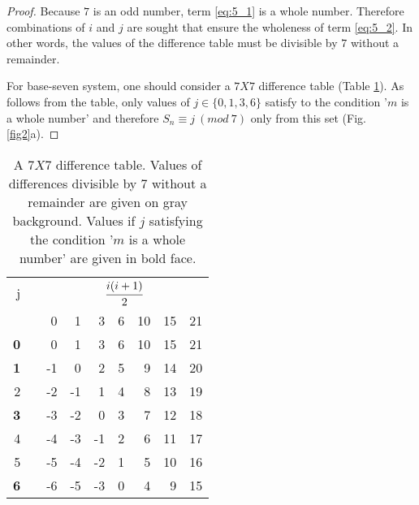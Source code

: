 \documentclass[12pt, twoside, leqno]{article}
\theoremstyle{definition}
\numberwithin{equation}{section}
\begin{document}
\begin{proof}
Because $7$ is an odd number, term \ref{eq:5_1} is a whole number. Therefore combinations of $i$ and $j$ are sought that ensure the wholeness of term \ref{eq:5_2}. In other words, the values of the difference table must be divisible by $7$ without a remainder.

For base-seven system, one should consider a $7X7$ difference table (Table \ref{tab:2}). As follows from the table, only values of $j \in \{ 0, 1, 3, 6 \}$ satisfy to the condition '$m$ is a whole number' and therefore $S_n \equiv j \ (mod \ 7)$ only from this set (Fig. \ref{fig2}a).
\end{proof}

\begin{table}[htb]
  \centering
  \caption{A $7X7$ difference table. Values of differences divisible by $7$ without a remainder are given on gray background. Values if $j$ satisfying the condition '$m$ is a whole number' are given in bold face.}
    \begin{tabular}{rrrrrrrrr}
    \hline
    j&&\multicolumn{7}{c}{$\cfrac{i(i +1)}{2}$}\\ \cline{3-9}
     &    & 0     & 1     & 3     & 6     & 10    & 15    & 21 \\
    \hline
    \textbf{0} &   & \cellcolor{lightgray} 0    & 1     & 3     & 6     & 10    & 15    & 21 \\
    \textbf{1} &   & -1    & 0     & 2     & 5     & 9     & \cellcolor{lightgray} 14    & 20 \\
    2 &   & -2    & -1    & 1     & 4     & 8     & 13    & 19 \\
    \textbf{3} &   & -3    & -2    & \cellcolor{lightgray} 0     & 3     & 7     & 12    & 18 \\
    4 &   & -4    & -3    & -1    & 2     & 6     & 11    & 17 \\
    5 &   & -5    & -4    & -2    & 1     & 5     & 10    & 16 \\
    \textbf{6} &   & -6    & -5    & -3    & \cellcolor{lightgray}0     & 4     & 9     & 15 \\
    \hline
    \end{tabular}%
  \label{tab:2}%
\end{table}%
\end{document}
